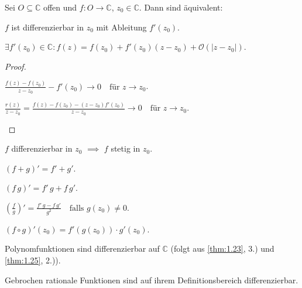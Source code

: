 \documentclass[a4paper,10pt]{scrbook}
\begin{document}
\begin{theorem}[Satz]
  Sei $O \subseteq \mathbb{C}$ offen und $f : O \to \mathbb{C}$, $z_0 \in \mathbb{C}$. Dann sind äquivalent:
  \begin{enum-roman}
    \item $f$ ist differenzierbar in $z_0$ mit Ableitung $f'(z_0)$.

    \item $\exists f'(z_0) \in \mathbb{C} : f(z) = f(z_0) + f'(z_0) (z-z_0) + \mathcal{O}(|z-z_0|)$.
  \end{enum-roman}

  \begin{proof}
    \begin{enum-roman}
      \item $\displaystyle \frac{f(z) - f(z_0)}{z-z_0} - f'(z_0) \to 0 \quad \text{für } z \to z_0$.

      \item $\displaystyle \frac{r(z)}{z-z_0} = \frac{f(z) - f(z_0) - (z-z_0) f'(z_0)}{z-z_0} \to 0 \quad \text{für } z \to z_0$.
    \end{enum-roman}
  \end{proof}
\end{theorem}

\begin{theorem}[Satz] \label{thm:1.25}
  \begin{enum-arab}
    \item $f$ differenzierbar in $z_0$ $\implies$ $f$ stetig in $z_0$.

    \item $(f+g)' = f' + g'$.

    \item $(f \, g)' = f' \, g + f \, g'$.

    \item $\displaystyle \left( \frac{f}{g} \right)' = \frac{f' \, g - f \, g'}{g^2} \quad \text{falls } g(z_0) \neq 0$.

    \item $(f \circ g)'(z_0) = f'(g(z_0)) \cdot g'(z_0)$.
  \end{enum-arab}
\end{theorem}

\begin{example}
  \begin{enum-arab}
    \item Polynomfunktionen sind differenzierbar auf $\mathbb{C}$ (folgt aus \ref{thm:1.23}, 3.) und \ref{thm:1.25}, 2.)).

    \item Gebrochen rationale Funktionen sind auf ihrem Definitionsbereich differenzierbar.
  \end{enum-arab}
\end{example}
\end{document}

